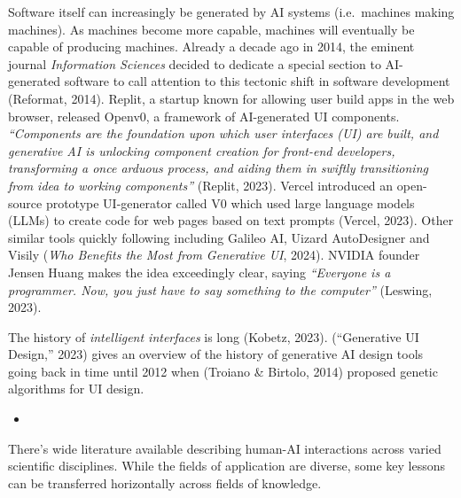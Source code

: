 \documentclass[
  letterpaper,
  DIV=11,
  numbers=noendperiod]{scrartcl}
\providecommand{\tightlist}{%
  \setlength{\itemsep}{0pt}\setlength{\parskip}{0pt}}\usepackage{longtable,booktabs,array}
\begin{document}
Software itself can increasingly be generated by AI systems
(i.e.~machines making machines). As machines become more capable,
machines will eventually be capable of producing machines. Already a
decade ago in 2014, the eminent journal \emph{Information Sciences}
decided to dedicate a special section to AI-generated software to call
attention to this tectonic shift in software development (Reformat,
2014). Replit, a startup known for allowing user build apps in the web
browser, released Openv0, a framework of AI-generated UI components.
\emph{``Components are the foundation upon which user interfaces (UI)
are built, and generative AI is unlocking component creation for
front-end developers, transforming a once arduous process, and aiding
them in swiftly transitioning from idea to working components''}
(Replit, 2023). Vercel introduced an open-source prototype UI-generator
called V0 which used large language models (LLMs) to create code for web
pages based on text prompts (Vercel, 2023). Other similar tools quickly
following including Galileo AI, Uizard AutoDesigner and Visily
(\emph{Who {Benefits} the Most from {Generative UI}}, 2024). NVIDIA
founder Jensen Huang makes the idea exceedingly clear, saying
\emph{``Everyone is a programmer. Now, you just have to say something to
the computer''} (Leswing, 2023).

The history of \emph{intelligent interfaces} is long (Kobetz, 2023).
({``Generative {UI Design},''} 2023) gives an overview of the history of
generative AI design tools going back in time until 2012 when (Troiano
\& Birtolo, 2014) proposed genetic algorithms for UI design.

\begin{itemize}
\tightlist
\item
\end{itemize}

There's wide literature available describing human-AI interactions
across varied scientific disciplines. While the fields of application
are diverse, some key lessons can be transferred horizontally across
fields of knowledge.
\end{document}
